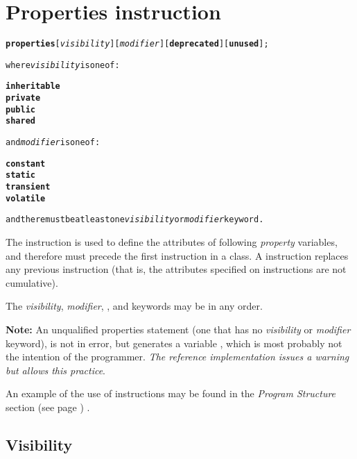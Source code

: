 \chapter{Properties instruction}\label{refprop}
\begin{shaded}
\begin{alltt}
\textbf{properties} [\emph{visibility}] [\emph{modifier}] [\textbf{deprecated}] [\textbf{unused}];

where \emph{visibility} is one of:

    \textbf{inheritable}
    \textbf{private}
    \textbf{public}
    \textbf{shared}

and \emph{modifier} is one of:

    \textbf{constant}
    \textbf{static}
    \textbf{transient}
    \textbf{volatile}

and there must be at least one \emph{visibility} or \emph{modifier} keyword.
\end{alltt}
\end{shaded}
 
The  instruction is used to define the attributes
of following \emph{property} variables, and therefore must precede the
first  instruction in a class.
A  instruction replaces any previous
 instruction (that is, the attributes specified on
 instructions are not cumulative).
 
The \emph{visibility}, \emph{modifier},
, and  keywords may be in any
order.

\begin{shaded}\noindent
\textbf{Note:} An unqualified properties statement (one that has no
\emph{visibility} or \emph{modifier} keyword), is not in error, but
generates a variable , which is most probably not
the intention of the
programmer. \emph{The reference
  implementation issues a warning but allows this practice}.
\end{shaded}
 
An example of the use of  instructions may be
found in the  \emph{Program Structure} section (see page \pageref{refpstruct}) .
\section{Visibility}
 
